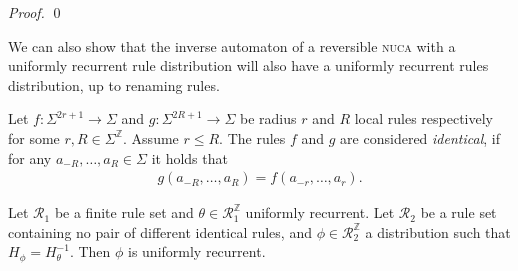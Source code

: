 \documentclass[runningheads]{llncs}
\newcommand{\Z}{\mathbb{Z}}
\newcommand{\R}{\mathcal{R}}
\begin{document}
\begin{proof}
%
%
\qed
\end{proof}
 
We can also show that the inverse automaton of a reversible \textsc{nuca} with a uniformly recurrent rule distribution will also have a uniformly recurrent rules distribution, up to renaming rules.

\begin{definition}
Let $f:\Sigma^{2r+1} \rightarrow \Sigma$ and $g:\Sigma^{2R+1} \rightarrow \Sigma$ be radius $r$ and $R$ local rules respectively for some $r,R\in \Sigma^\Z$. Assume $r \leq R$. The rules $f$ and $g$ are considered \emph{identical}, if for any $a_{-R},\ldots,a_{R} \in \Sigma$ it holds that
\begin{align*}
g(a_{-R},\ldots,a_{R}) = f(a_{-r},\ldots,a_r).
\end{align*}
\end{definition}



\begin{theorem} \label{unif_revers_unif}
Let $\R_1$ be a finite rule set and $\theta \in \R_1^\Z$ uniformly recurrent. Let $\R_2$ be a rule set containing no pair of different identical rules, and $\phi \in \R_2^\Z$ a distribution such that $H_\phi = H_\theta^{-1}$. Then $\phi$ is uniformly recurrent.
\end{theorem}
\end{document}
